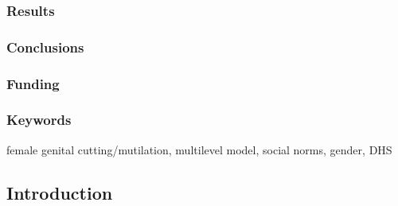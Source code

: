 \documentclass[12pt,]{article}
\begin{document}
\subsubsection{Results}\label{results}

\subsubsection{Conclusions}\label{conclusions}

\subsubsection{Funding}\label{funding}

\subsubsection{Keywords}\label{keywords}

female genital cutting/mutilation, multilevel model, social norms, gender, DHS

\subsection{Introduction}\label{introduction}
\end{document}
